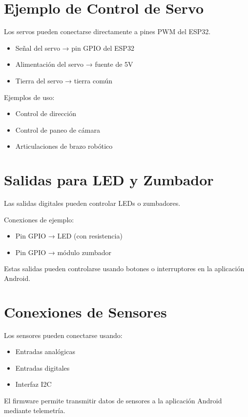 \section{Ejemplo de Control de Servo}

Los servos pueden conectarse directamente a pines PWM del ESP32.

\begin{itemize}
    \item Señal del servo → pin GPIO del ESP32
    \item Alimentación del servo → fuente de 5V
    \item Tierra del servo → tierra común
\end{itemize}

Ejemplos de uso:

\begin{itemize}
    \item Control de dirección
    \item Control de paneo de cámara
    \item Articulaciones de brazo robótico
\end{itemize}

\section{Salidas para LED y Zumbador}

Las salidas digitales pueden controlar LEDs o zumbadores.

Conexiones de ejemplo:

\begin{itemize}
    \item Pin GPIO → LED (con resistencia)
    \item Pin GPIO → módulo zumbador
\end{itemize}

Estas salidas pueden controlarse usando botones o interruptores en la aplicación Android.

\section{Conexiones de Sensores}

Los sensores pueden conectarse usando:

\begin{itemize}
    \item Entradas analógicas
    \item Entradas digitales
    \item Interfaz I2C
\end{itemize}

El firmware permite transmitir datos de sensores a la aplicación Android mediante telemetría.